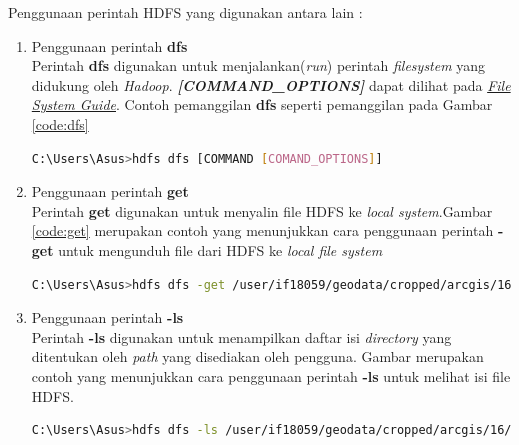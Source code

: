 Penggunaan perintah HDFS yang digunakan antara lain :
\begin{enumerate}
	\item Penggunaan perintah \textbf{dfs}\\
	Perintah \textbf{dfs} digunakan untuk menjalankan(\textit{run}) perintah \textit{filesystem} yang didukung oleh \textit{Hadoop}. \textit{\textbf{[COMMAND\_OPTIONS]}} dapat dilihat pada \href{https://hadoop.apache.org/docs/stable/hadoop-project-dist/hadoop-common/FileSystemShell.html}{\textit{File System Guide}}. Contoh pemanggilan \textbf{dfs} seperti pemanggilan pada Gambar \ref{code:dfs}
	
	\begin{lstlisting}[language=Bash, caption=Perintah HDFS dfs,label={code:dfs}]
		C:\Users\Asus>hdfs dfs [COMMAND [COMAND_OPTIONS]]
	\end{lstlisting}
	
	\item Penggunaan perintah \textbf{get}\\
	Perintah \textbf{get} digunakan untuk menyalin file HDFS ke \textit{local system}.Gambar \ref{code:get} merupakan contoh yang menunjukkan cara penggunaan perintah \textbf{-get} untuk mengunduh file dari HDFS ke \textit{local file system}
	\begin{lstlisting}[language=Bash, caption=Perintah HDFS dfs -get untuk mengunduh file HDFS Kota\_Bandung.txt ke \textit{local system},label={code:get}]
		C:\Users\Asus>hdfs dfs -get /user/if18059/geodata/cropped/arcgis/16/Jawa_Barat/Kota_Bandung.txt .
	\end{lstlisting}
	\item Penggunaan perintah \textbf{-ls}\\
	Perintah \textbf{-ls} digunakan untuk menampilkan daftar isi \textit{directory} yang ditentukan oleh \textit{path} yang disediakan oleh pengguna. Gambar merupakan contoh yang menunjukkan cara penggunaan perintah \textbf{-ls} untuk melihat isi file HDFS.
	\begin{lstlisting}[language=Bash, caption=Perintah HDFS dfs -get untuk mengunduh file HDFS Kota\_Bandung.txt ke \textit{local system},label={code:ls}]
		C:\Users\Asus>hdfs dfs -ls /user/if18059/geodata/cropped/arcgis/16/Jawa_Barat
	\end{lstlisting}
\end{enumerate}




